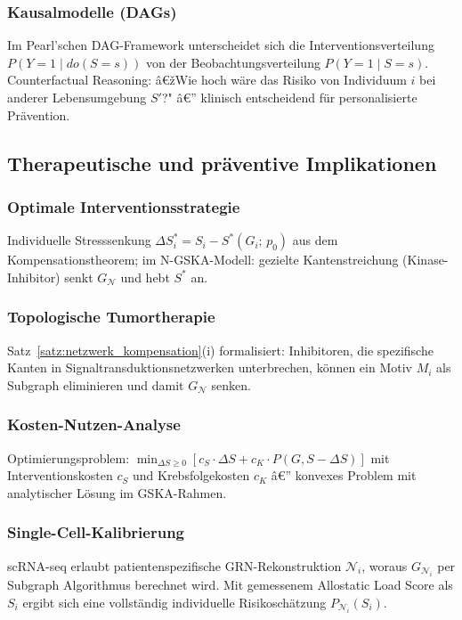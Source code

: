 ﻿\documentclass[12pt, a4paper]{article}
\theoremstyle{definition}
\theoremstyle{remark}
\newcommand{\calN}{\mathcal{N}}
\newcommand{\GN}{G_{\calN}}
\begin{document}
\subsubsection{Kausalmodelle (DAGs)}

Im Pearl'schen DAG-Framework unterscheidet sich die Interventionsverteilung
$P(Y=1 \mid do(S=s))$ von der Beobachtungsverteilung $P(Y=1 \mid S=s)$.
Counterfactual Reasoning: â€žWie hoch wäre das Risiko von Individuum $i$ bei
anderer Lebensumgebung $S'$?" â€” klinisch entscheidend für personalisierte Prävention.

\subsection{Therapeutische und präventive Implikationen}

\subsubsection{Optimale Interventionsstrategie}

Individuelle Stresssenkung $\Delta S_i^* = S_i - S^*(G_i;\,p_0)$ aus dem
Kompensationstheorem; im N-GSKA-Modell: gezielte Kantenstreichung
(Kinase-Inhibitor) senkt $\GN$ und hebt $S^*$ an.

\subsubsection{Topologische Tumortherapie}

Satz~\ref{satz:netzwerk_kompensation}(i) formalisiert: Inhibitoren, die spezifische
Kanten in Signaltransduktionsnetzwerken unterbrechen, können ein Motiv $M_i$ als
Subgraph eliminieren und damit $\GN$ senken.

\subsubsection{Kosten-Nutzen-Analyse}

Optimierungsproblem: $\min_{\Delta S \geq 0}[c_S \cdot \Delta S + c_K \cdot P(G, S-\Delta S)]$
mit Interventionskosten $c_S$ und Krebsfolgekosten $c_K$ â€” konvexes Problem mit
analytischer Lösung im GSKA-Rahmen.

\subsubsection{Single-Cell-Kalibrierung}

scRNA-seq erlaubt patientenspezifische GRN-Rekonstruktion $\calN_i$, woraus
$G_{\calN_i}$ per Subgraph Algorithmus berechnet wird. Mit gemessenem
Allostatic Load Score als $S_i$ ergibt sich eine vollständig individuelle
Risikoschätzung $P_{\calN_i}(S_i)$.
\end{document}
